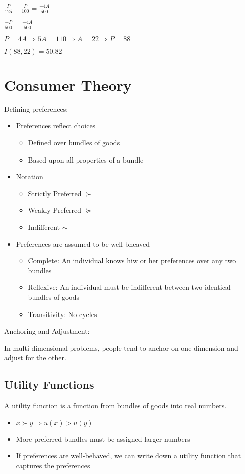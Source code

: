 \documentclass[12pt]{article}
\begin{document}
$\frac{P}{125} - \frac{P}{100} = \frac{-4A}{500}$

$\frac{-P}{500} = \frac{-4A}{500}$

$P = 4A \Rightarrow 5A = 110 \Rightarrow A = 22 \Rightarrow P = 88$

$I(88, 22) = 50.82$
\newpage
\section{Consumer Theory}

Defining preferences:
\begin{itemize}
    \item Preferences reflect choices
    \begin{itemize}
        \item Defined over bundles of goods
        \item Based upon all properties of a bundle
    \end{itemize}
    \item Notation
    \begin{itemize}
        \item Strictly Preferred $\succ$
        \item Weakly Preferred $\succeq$
        \item Indifferent $\sim$
    \end{itemize}
    \item Preferences are assumed to be well-bheaved
    \begin{itemize}
        \item Complete: An individual knows hiw or her preferences over any two bundles
        \item Reflexive: An individual must be indifferent between two identical bundles of goods
        \item Transitivity: No cycles
    \end{itemize}
\end{itemize}

Anchoring and Adjustment:

In multi-dimensional problems, people tend to anchor on one dimension and adjust for the other.

\subsection{Utility Functions}

A utility function is a function from bundles of goods into real numbers.
\begin{itemize}
    \item $x \succ y \Rightarrow u(x) > u(y)$
    \item More preferred bundles must be assigned larger numbers
    \item If preferences are well-behaved, we can write down a utility function that captures the preferences
\end{itemize}
\end{document}
